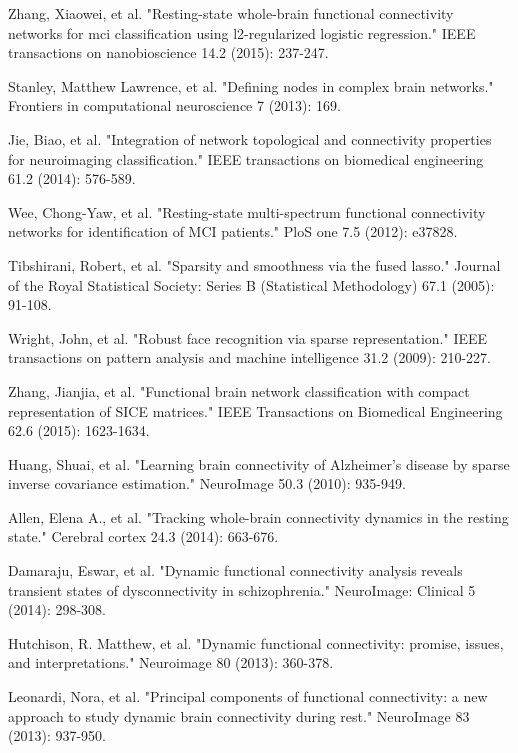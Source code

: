 \documentclass[journal]{IEEEtran}
\begin{document}
{\begin{thebibliography}{1}
		Zhang, Xiaowei, et al. "Resting-state whole-brain functional connectivity networks for mci classification using l2-regularized logistic regression." IEEE transactions on nanobioscience 14.2 (2015): 237-247.
		
		Stanley, Matthew Lawrence, et al. "Defining nodes in complex brain networks." Frontiers in computational neuroscience 7 (2013): 169.
		
		Jie, Biao, et al. "Integration of network topological and connectivity properties for neuroimaging classification." IEEE transactions on biomedical engineering 61.2 (2014): 576-589.
		
		Wee, Chong-Yaw, et al. "Resting-state multi-spectrum functional connectivity networks for identification of MCI patients." PloS one 7.5 (2012): e37828.
		
		Tibshirani, Robert, et al. "Sparsity and smoothness via the fused lasso." Journal of the Royal Statistical Society: Series B (Statistical Methodology) 67.1 (2005): 91-108.
		
		Wright, John, et al. "Robust face recognition via sparse representation." IEEE transactions on pattern analysis and machine intelligence 31.2 (2009): 210-227.
		
		Zhang, Jianjia, et al. "Functional brain network classification with compact representation of SICE matrices." IEEE Transactions on Biomedical Engineering 62.6 (2015): 1623-1634.
		
		Huang, Shuai, et al. "Learning brain connectivity of Alzheimer's disease by sparse inverse covariance estimation." NeuroImage 50.3 (2010): 935-949.
		
		Allen, Elena A., et al. "Tracking whole-brain connectivity dynamics in the resting state." Cerebral cortex 24.3 (2014): 663-676.
		
		Damaraju, Eswar, et al. "Dynamic functional connectivity analysis reveals transient states of dysconnectivity in schizophrenia." NeuroImage: Clinical 5 (2014): 298-308.
		
		Hutchison, R. Matthew, et al. "Dynamic functional connectivity: promise, issues, and interpretations." Neuroimage 80 (2013): 360-378.
		
		Leonardi, Nora, et al. "Principal components of functional connectivity: a new approach to study dynamic brain connectivity during rest." NeuroImage 83 (2013): 937-950.
		

\end{thebibliography}}
\end{document}
